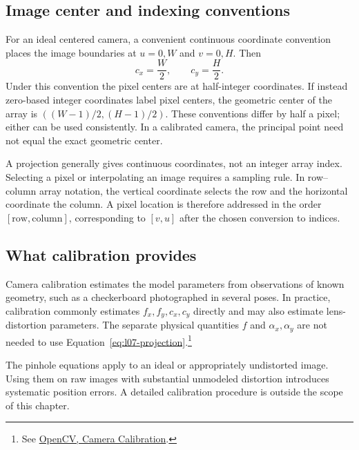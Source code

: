 \subsection{Image center and indexing conventions}
For an ideal centered camera, a convenient continuous coordinate convention
places the image boundaries at $u=0,W$ and $v=0,H$. Then
\[
 c_x=\frac W2,\qquad c_y=\frac H2.
\]
Under this convention the pixel centers are at half-integer coordinates.
If instead zero-based integer coordinates label pixel centers, the geometric
center of the array is $((W-1)/2,(H-1)/2)$. These conventions differ by half
a pixel; either can be used consistently. In a calibrated camera, the
principal point need not equal the exact geometric center.

A projection generally gives continuous coordinates, not an integer array
index. Selecting a pixel or interpolating an image requires a sampling rule.
In row--column array notation, the vertical coordinate selects the row and
the horizontal coordinate the column. A pixel location is therefore addressed
in the order $[\text{row},\text{column}]$, corresponding to $[v,u]$ after
the chosen conversion to indices.

\subsection{What calibration provides}
Camera calibration estimates the model parameters from observations of known
geometry, such as a checkerboard photographed in several poses. In practice,
calibration commonly estimates $f_x,f_y,c_x,c_y$ directly and may also
estimate lens-distortion parameters. The separate physical quantities $f$
and $\alpha_x,\alpha_y$ are not needed to use
Equation~\eqref{eq:l07-projection}.\footnote{See
\href{https://docs.opencv.org/doc/doxygen/html/d4/d93/group__calib.html}{OpenCV, Camera Calibration}.}

The pinhole equations apply to an ideal or appropriately undistorted image.
Using them on raw images with substantial unmodeled distortion introduces
systematic position errors. A detailed calibration procedure is outside
the scope of this chapter.

